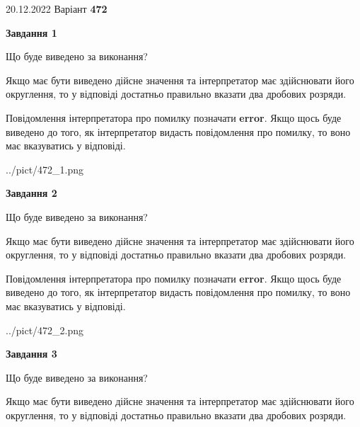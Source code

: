 \documentclass[12pt, ukrainian]{article}
\begin{document}
{20.12.2022 Варіант \No \textbf { 472 }\par}
{
\begin {Large}

{\begin {center}\textbf{Завдання 1}\end {center}}\par
Що буде виведено за виконання? \par

Якщо має бути виведено дійсне значення та інтерпретатор має здійснювати його округлення, 
то у відповіді достатньо правильно вказати два дробових розряди.

Повідомлення інтерпретатора про помилку позначати \textbf{error}.
Якщо щось буде виведено до того, як інтерпретатор видасть повідомлення про помилку, 
то воно має вказуватись у відповіді. \par

\begin{center}
	{../pict/472_1.png}
\end{center}
\newpage

{\begin {center}\textbf{Завдання 2}\end {center}}\par
Що буде виведено за виконання? \par

Якщо має бути виведено дійсне значення та інтерпретатор має здійснювати його округлення, 
то у відповіді достатньо правильно вказати два дробових розряди.

Повідомлення інтерпретатора про помилку позначати \textbf{error}.
Якщо щось буде виведено до того, як інтерпретатор видасть повідомлення про помилку, 
то воно має вказуватись у відповіді. \par

\begin{center}
	{../pict/472_2.png}
\end{center}
\newpage

{\begin {center}\textbf{Завдання 3}\end {center}}\par
Що буде виведено за виконання? \par

Якщо має бути виведено дійсне значення та інтерпретатор має здійснювати його округлення, 
то у відповіді достатньо правильно вказати два дробових розряди.


\end{Large}}
\end{document}
